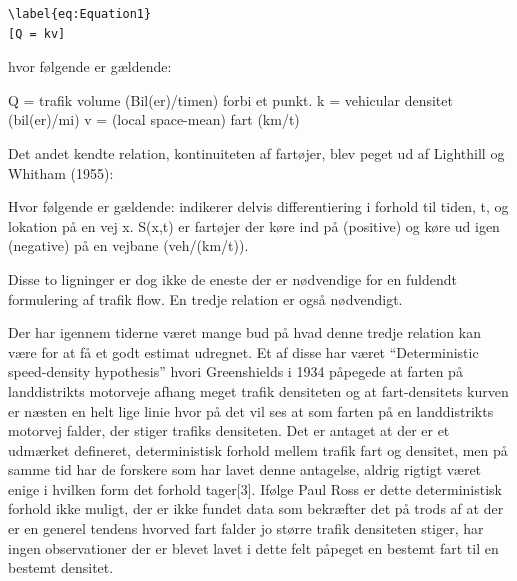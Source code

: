 \begin{verbatim}\label{eq:Equation1}
[Q = kv]
\end{verbatim}

						
hvor følgende er gældende:

Q = trafik volume (Bil(er)/timen) forbi et punkt.
k  = vehicular densitet (bil(er)/mi)
v  = (local space-mean) fart (km/t)

Det andet kendte relation, kontinuiteten af fartøjer, blev peget ud af Lighthill og Whitham (1955):


Hvor følgende er gældende:
indikerer delvis differentiering i forhold til tiden, t, og lokation på en vej x.
S(x,t) er fartøjer der køre ind på (positive) og køre ud igen (negative) på en vejbane (veh/(km/t)).

Disse to ligninger er dog ikke de eneste der er nødvendige for en fuldendt formulering af trafik flow. En tredje relation er også nødvendigt.

Der har igennem tiderne været mange bud på hvad denne tredje relation kan være for at få et godt estimat udregnet. Et af disse har været “Deterministic speed-density hypothesis” hvori Greenshields i 1934 påpegede at farten på landdistrikts motorveje afhang meget trafik densiteten og at fart-densitets kurven er næsten en helt lige linie hvor på det vil ses at som farten på en landdistrikts motorvej falder, der stiger trafiks densiteten. Det er antaget at der er et udmærket defineret, deterministisk forhold mellem trafik fart og densitet, men på samme tid har de forskere som har lavet denne antagelse, aldrig rigtigt været enige i hvilken form det forhold tager[3].
Ifølge Paul Ross er dette deterministisk forhold ikke muligt, der er ikke fundet data som bekræfter det på trods af at der er en generel tendens hvorved fart falder jo større trafik densiteten stiger, har ingen observationer der er blevet lavet i dette felt påpeget en bestemt fart til en bestemt densitet.

